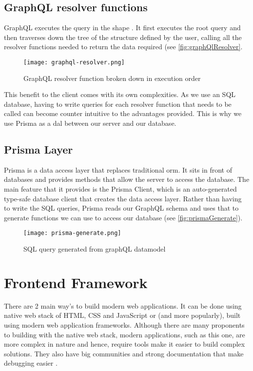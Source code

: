 \subsection{GraphQL resolver functions}
GraphQL executes the query in the shape \cite{jonas2016graphql}. It first executes the root query and then traverses down the tree of the structure defined by the user, calling all the resolver functions needed to return the data required (see \autoref{fig:graphQlResolver}.


\begin{figure}[htb!]
    \centering
    \texttt{[image: graphql-resolver.png]}
    \caption{GraphQL resolver function broken down in execution order \cite{jonas2016graphql}}
    \label{fig:graphQlResolver}
\end{figure}

This benefit to the client comes with its own complexities. As we use an SQL database, having to write queries for each resolver function that needs to be called can become counter intuitive to the advantages provided. This is why we use Prisma as a \acrfull{dal} between our server and our database.

\subsection{Prisma Layer}
Prisma \cite{prisma} is a data access layer that replaces traditional \acrfull{orm}. It sits in front of databases and provides methods that allow the server to access the database. The main feature that it provides is the Prisma Client, which is an auto-generated type-safe database client that creates the data access layer. Rather than having to write the SQL queries, Prisma reads our GraphQL schema and uses that to generate functions we can use to access our database (see \autoref{fig:prismaGenerate}).

\begin{figure}[htb!]
    \centering
    \texttt{[image: prisma-generate.png]}
    \caption{SQL query generated from graphQL datamodel \cite{prismageneratesql}}
    \label{fig:prismaGenerate}
\end{figure}


\section{Frontend Framework} \label{sec:frontendFramework}
There are 2 main way's to build modern web applications. It can be done using native web stack of HTML, CSS and JavaScript or (and more popularly), built using modern web application frameworks. Although there are many proponents to building with the native web stack, modern applications, such as this one, are more complex in nature and hence, require tools make it easier to build complex solutions. They also have big communities and strong documentation that make debugging easier \cite{medium:WhyModernJSFrameworkExist}.

